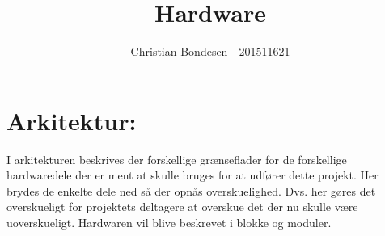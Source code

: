 \documentclass[11pt]{article}
\title{Hardware}
\author{Christian Bondesen - 201511621}
\begin{document}
\maketitle
\section{Arkitektur: }
I arkitekturen beskrives der forskellige grænseflader for de forskellige hardwaredele der er ment at skulle bruges for at udfører dette projekt. Her brydes de enkelte dele ned så der opnås overskuelighed. Dvs. her gøres det overskueligt for projektets deltagere at overskue det der nu skulle være uoverskueligt. Hardwaren vil blive beskrevet i blokke og moduler.
\end{document}
